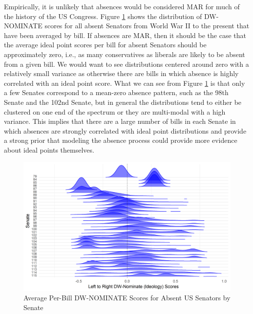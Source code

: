 Empirically, it is unlikely that absences would be considered MAR for much of the history of the US Congress. Figure \ref{dw_abs} shows the distribution of DW-NOMINATE scores for all absent Senators from World War II to the present that have been averaged by bill. If absences are MAR, then it should be the case that the average ideal point scores per bill for absent Senators should be approximately zero, i.e., as many conservatives as liberals are likely to be absent from a given bill. We would want to see distributions centered around zero with a relatively small variance as otherwise there are bills in which absence is highly correlated with an ideal point score. What we can see from Figure \ref{dw_abs} is that only a few Senates correspond to a mean-zero absence pattern, such as the 98th Senate and the 102nd Senate, but in general the distributions tend to either be clustered on one end of the spectrum or they are multi-modal with a high variance. This implies that there are a large number of bills in each Senate in which absences are strongly correlated with ideal point distributions and provide a strong prior that modeling the absence process could provide more evidence about ideal points themselves.
\begin{figure}[h!]
	\caption{Average Per-Bill DW-NOMINATE Scores for Absent US Senators by Senate}\label{dw_abs}
	\includegraphics[width=0.9\linewidth]{dw_abs}
\end{figure}
	
